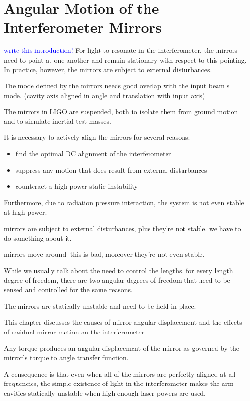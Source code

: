 \chapter{Angular Motion of the Interferometer Mirrors}

\textcolor{blue}{write this introduction!}
For light to resonate in the interferometer, the mirrors need to point at one another and remain stationary with respect to this pointing. In practice, however, the mirrors are subject to external disturbances. 

The mode defined by the mirrors needs good overlap with the input beam's mode. (cavity axis aligned in angle and translation with input axis)

The mirrors in LIGO are suspended, both to isolate them from ground motion and to simulate inertial test masses. 


It is necessary to actively align the mirrors for several reasons:
\begin{itemize}
\item find the optimal DC alignment of the interferometer \vspace{-10 pt}
\item suppress any motion that does result from external disturbances \vspace{-10 pt}
\item counteract a high power static instability
\end{itemize}
Furthermore, due to radiation pressure interaction, the system is not even stable at high power.

mirrors are subject to external disturbances, plus they're not stable. we have to do something about it. 

mirrors move around, this is bad, moreover they're not even stable.

While we usually talk about the need to control the lengths, for every length degree of freedom, there are two angular degrees of freedom that need to be sensed and controlled for the same reasons. 

The mirrors are statically unstable and need to be held in place. 

This chapter discusses the causes of mirror angular displacement and the effects of residual mirror motion on the interferometer.




Any torque produces an angular displacement of the mirror as governed by the mirror's torque to angle transfer function.

A consequence is that even when all of the mirrors are perfectly aligned at all frequencies, the simple existence of light in the interferometer makes the arm cavities statically unstable when high enough laser powers are used.






